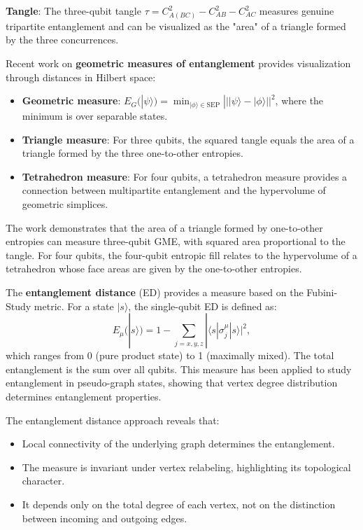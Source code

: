 \documentclass[12pt,a4paper]{article}
\begin{document}
\textbf{Tangle}: The three-qubit tangle $\tau = C_{A(BC)}^2 - C_{AB}^2 - C_{AC}^2$ measures genuine tripartite entanglement and can be visualized as the "area" of a triangle formed by the three concurrences.

Recent work on \textbf{geometric measures of entanglement} provides visualization through distances in Hilbert space:
\begin{itemize}
	\item \textbf{Geometric measure}: $E_G(|\psi\rangle) = \min_{|\phi\rangle \in \text{SEP}} |||\psi\rangle - |\phi\rangle||^2$, where the minimum is over separable states.
	\item \textbf{Triangle measure}: For three qubits, the squared tangle equals the area of a triangle formed by the three one-to-other entropies.
	\item \textbf{Tetrahedron measure}: For four qubits, a tetrahedron measure provides a connection between multipartite entanglement and the hypervolume of geometric simplices.
\end{itemize}

The work demonstrates that the area of a triangle formed by one-to-other entropies can measure three-qubit GME, with squared area proportional to the tangle. For four qubits, the four-qubit entropic fill relates to the hypervolume of a tetrahedron whose face areas are given by the one-to-other entropies.

The \textbf{entanglement distance} (ED) \cite{EntanglementDistance} provides a measure based on the Fubini-Study metric. For a state $|s\rangle$, the single-qubit ED is defined as:
\begin{equation}
	E_\mu(|s\rangle) = 1 - \sum_{j=x,y,z} |\langle s|\sigma_j^\mu|s\rangle|^2,
\end{equation}
which ranges from 0 (pure product state) to 1 (maximally mixed). The total entanglement is the sum over all qubits. This measure has been applied to study entanglement in pseudo-graph states, showing that vertex degree distribution determines entanglement properties.

The entanglement distance approach reveals that:
\begin{itemize}
	\item Local connectivity of the underlying graph determines the entanglement.
	\item The measure is invariant under vertex relabeling, highlighting its topological character.
	\item It depends only on the total degree of each vertex, not on the distinction between incoming and outgoing edges.
\end{itemize}
\end{document}
